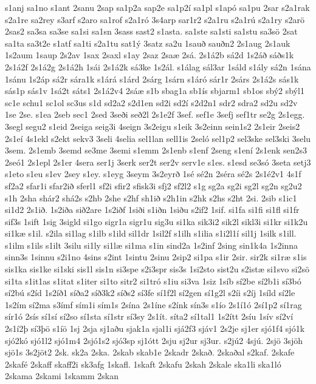 {s1anj
sa1no
s1ant
2sanu
2sap
sa1p2a
sap2e
sa1p2í
sa1pl
s1apó
sa1pu
2sar
s2a1rak
s2a1re
sa2rey
s3arf
s2aro
sa1rof
s2a1ró
3s4arp
sar1r2
s2a1ru
s2a1rú
s2a1ry
s2arö
2sas2
sa3sa
sa3se
sa1si
sa1sn
3sass
sast2
s1asta.
sa1ste
sa1sti
sa1stu
sa3sö
2sat
sa1ta
sa3t2e
s1atf
sa1ti
s2a1tu
sat1ý
3satz
sa2u
1sauð
sauðn2
2s1aug
2s1auk
1s2aum
1saup
2s2av
1sax
2saxl
s1ay
2saz
2saæ
2sá.
2s1á2b
sá2d
1s2áð
sáðs1k
2s1á2f
2s1á2g
2s1á2h
1sái
2s1á2k
sá3ke
1s2ál.
s1álag
sál3ar
1sáld
s1ály
sá2n
1sána
1sánu
1s2áp
sá2r
sára1k
s1árá
s1árd
2sárg
1sárn
s1áró
sár1r
2sárs
2s1á2s
sás1k
sás1p
sás1v
1sá2t
sáts1
2s1á2v4
2sáæ
s1b
sbag1a
sb1ís
sbjarm1
sb1os
sbý2
sbýl1
sc1e
schu1
sc1ol
sc3us
s1d
sd2a2
s2d1en
sd2i
sd2í
s2d2n1
sdr2
sdra2
sd2u
sd2v
1se
2se.
s1ea
2seb
sec1
2sed
3seði
seð2l
2s1e2f
3sef.
sef1e
3sefj
sef1tr
se2g
2s1egg.
3segl
segu2
s1eid
2seiga
seig3i
4seign
3s2eigu
s1eik
3s2einn
sein1s2
2s1eir
2seis2
2s1eí
4s1ekl
s2ekt
sekv3
3seli
4selia
sel1lan
sell1is
2seló
sel1p2
sel3ske
sel3ski
3selu
3sem.
2s1emb
3semd
se3me
3semi
s1emm
2s1enb
s1enf
2seng
s1ení
2s1enk
sen2s3
2seó1
2s1epl
2s1er
4sera
ser1j
3serk
ser2t
ser2v
serv1e
s1es.
s1esd
se3só
3seta
setj3
s1eto
s1eu
s1ev
2sey
s1ey.
s1eyg
3seym
3s2eyrð
1sé
sé2n
2séra
sé2s
2s1é2v1
4s1f
sf2a2
sfar1i
sfar2ið
sferl1
sf2i
sfir2
sfisk3i
sfj2
sf2l2
s1g
sg2a
sg2i
sg2l
sg2n
sg2u2
s1h
2sha
shár2
shá2s
s2hb
2she
s2hf
sh1ið
s2h1in
s2hk
s2hs
s2ht
2si.
2sib
s1ic1
si1d2
2s1ið.
1s2iða
sið2are
1s2iðf
1siði
s1iðn
1siðu
s2if2
1sif.
si1fa
si1fi
si1fl
si1fr
sif3s
1sift
1sig
3sigld
si1go
sigr1a
sigr1u
sig3u
si1ka
sik3i2
sik2l
sikl3i
si1kr
si1k2u
si1kæ
s1il.
s2ila
si1lag
s1ilb
s1ild
sil1dr
1sil2f
s1ilh
s1ilia
s1i2l1í
sil1j
1silk
s1ill.
s1ilm
s1ils
s1ilt
3silu
si1ly
si1læ
si1ma
s1in
sind2a
1s2inf
2sing
sin1k4a
1s2inna
sinn3s
1sinnu
s2i1no
4sins
s2int
1sintu
2sinu
2sip2
si1pa
s1ir
2sir.
sir2k
si1ræ
s1is
sis1ka
sis1ke
si1ski
sis1l
sis1n
si3spe
s2i3spr
sis3s
1si2sto
sist2u
s2istæ
si1svo
si2sö
si1ta
s1it1as
s1itat
s1iter
si1to
sitr2
si1tró
s1iu
si3va
1siz
1síb
sí2be
sí2b1i
sí3bó
sí2bú
s2íd
1s2íð1
síða2
síð3k2
síðs2
sí3fe
sí1f2l
sí2gen
sí1g2l
s2íi
s2íj
1síld
sí2le
1s2ím
sí2ma
s3ímf
sím1i
sím1s
2sína
2s1íne
s2ínk
sín3s
s1ío
2s1í1ó
2sí1p2
sí1rag
sír1ó
2sís
sí1sí
sí2so
sí1sta
sí1str
sí3sy
2s1ít.
síta2
sí1tal1
1s2ítt
2síu
1sív
sí2ví
2s1í2þ
sí3þö
s1íö
1sj
2sja
sj1aðu
sjak1a
sjal1i
sjá2f3
sjáv1
2s2je
sj1er
sjó1f4
sjó1k
sjó2kó
sjó1l2
sjó1m4
2sjó1s2
sjó3sp
sj1ótt
2sju
sj2ur
sj3ur.
s2jú2
4sjú.
2sjö
3sjöh
sjö1s
3s2jöt2
2sk.
sk2a
2ska.
2skab
skab1e
2skadr
2skað.
2skaðal
s2kaf.
2skafe
2skafé
2skaff
skaff2i
sk3afg
1skafl.
1skaft
2skafu
2skah
2skale
ska1li
ska1ló
2skama
2skami
1skamm
2skan
}
